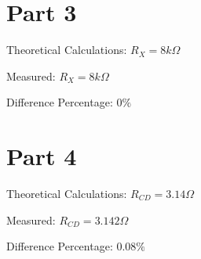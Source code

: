 \documentclass{report}
\begin{document}
    \section*{Part 3}
        {
            Theoretical Calculations: $R_X = 8k\Omega$

            Measured: $R_X = 8k\Omega$

            Difference Percentage: $0\%$

        }

    \section*{Part 4}
        {
            Theoretical Calculations: $R_{CD} = 3.14\Omega$

            Measured: $R_{CD} = 3.142\Omega$

            Difference Percentage: $0.08\%$

        }
\end{document}
